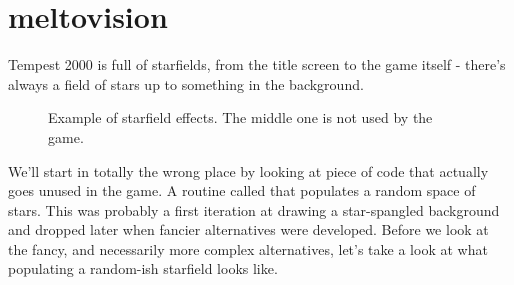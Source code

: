 \chapter{meltovision}
\label{sec:meltovision}
\lstset{style=68KStyle}

Tempest 2000 is full of starfields, from the title screen to the game itself - there's always a field of stars up to something in the background.

\begin{figure}[H]
    \centering
    \begin{adjustbox}{width=12cm,center}
      \hspace{0.5cm}
      \hspace{0.5cm}
    \end{adjustbox}
  \caption{Example of starfield effects. The middle one is not used by the game.}
\end{figure}

We'll start in totally the wrong place by looking at piece of code that actually goes unused in the game. A routine called
 that populates a random space of stars. This was probably a first iteration at drawing a star-spangled
background and dropped later when fancier alternatives were developed. Before we look at the fancy, and necessarily more complex
alternatives, let's take a look at what populating a random-ish starfield looks like.

